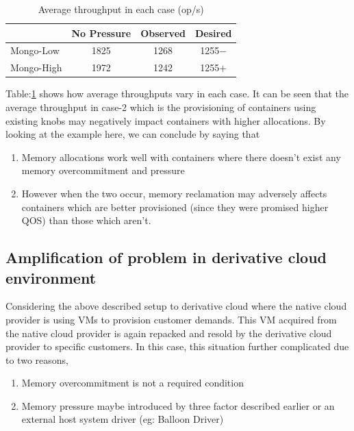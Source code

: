 	\pagebreak

	\begin{table}
	  \begin{center}
	    \begin{tabular}{ l | c | c | c }	      	    
		  & No Pressure & Observed & Desired \\ 
	      \hline
	      \hline
	      Mongo-Low  & 1825 & 1268 & 1255$-$ \\  
	      \hline
	      Mongo-High & 1972 & 1242 & 1255$+$ \\
		
	    \end{tabular}
	  \caption{Average throughput in each case (op/s)}
	  \label{table_intro_th}
	  \end{center}	  
	\end{table}
	
	Table:\ref{table_intro_th} shows how average throughputs vary in each case. It can be seen that the average throughput in case-2 
which is the provisioning of containers using existing knobs may negatively impact containers with higher allocations. By looking at the 
example here, we can conclude by saying that 
	
	\begin{enumerate}
	  \item Memory allocations work well with containers where there doesn't exist any memory overcommitment and pressure
	  \item However when the two occur, memory reclamation may adversely affects containers which are better provisioned (since they 
were promised higher QOS) than those which aren't.
	\end{enumerate}
    
    \subsection{Amplification of problem in derivative cloud environment}
    
      Considering the above described setup to derivative cloud where the native cloud provider is using VMs to provision customer demands. 
This VM acquired from the native cloud provider is again repacked and resold by the derivative cloud provider to specific customers. In 
this case, this situation further complicated due to two reasons,
      
       \begin{enumerate}
	  \item Memory overcommitment is not a required condition
	  \item Memory pressure maybe introduced by three factor described earlier or an external host system driver (eg: Balloon Driver)
       \end{enumerate}

